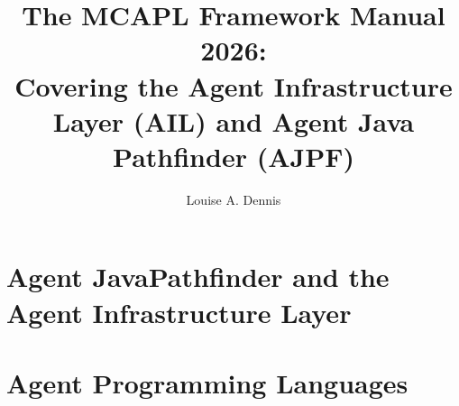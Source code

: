 \documentclass[a4]{book}
\author{Louise A. Dennis}
\title{The MCAPL Framework Manual 2026: \\
Covering the Agent Infrastructure Layer (AIL) and Agent Java Pathfinder (AJPF)}
\begin{document}
\maketitle

\tableofcontents

\SetJava






\part{Agent JavaPathfinder and the Agent Infrastructure Layer}







\part{Agent Programming Languages}













\printindex
\end{document}

